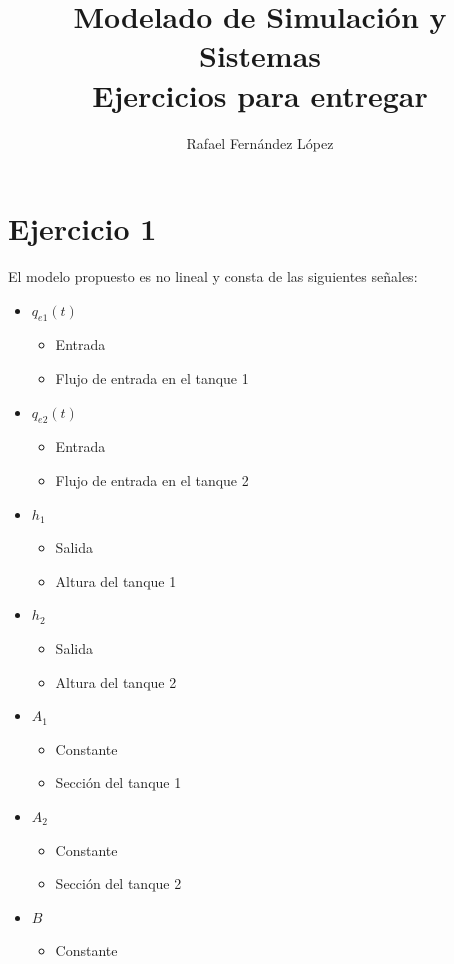\documentclass[12pt]{article}
\title{Modelado de Simulación y Sistemas\\Ejercicios para entregar}
\author{Rafael Fernández López}
\date{}
\begin{document}
\maketitle
\newpage
\tableofcontents
\newpage

\section{Ejercicio 1}
El modelo propuesto es no lineal y consta de las siguientes señales:
\begin{itemize}
    \item $q_{e1}(t)$
    \begin{itemize}
        \item Entrada
        \item Flujo de entrada en el tanque 1
    \end{itemize}
    \item $q_{e2}(t)$
    \begin{itemize}
        \item Entrada
        \item Flujo de entrada en el tanque 2
    \end{itemize}
    \item $h_1$
    \begin{itemize}
        \item Salida
        \item Altura del tanque 1
    \end{itemize}
    \item $h_2$
    \begin{itemize}
        \item Salida
        \item Altura del tanque 2
    \end{itemize}
    \item $A_1$
    \begin{itemize}
        \item Constante
        \item Sección del tanque 1
    \end{itemize}
    \item $A_2$
    \begin{itemize}
        \item Constante
        \item Sección del tanque 2
    \end{itemize}
    \item $B$
    \begin{itemize}
        \item Constante

\end{itemize}
\end{itemize}
\end{document}
